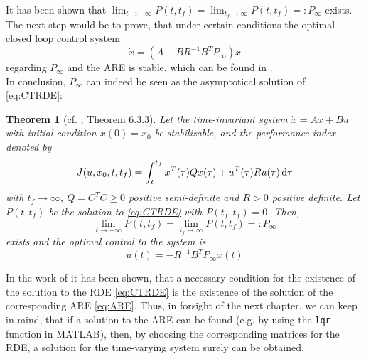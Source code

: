 \documentclass[paper=a4, pagesize, DIV=calc, BCOR=12.5mm, twoside=on, onecolumn=on, open = any, titlepage =on, parskip =half-, headsepline = on, footsepline = on, chapterprefix = on, appendixprefix = off, fontsize = 12pt, numbers = noenddot, abstract = on]{scrbook}
\numberwithin{equation}{chapter}
\theoremstyle{definition}
\theoremstyle{plain}
\theoremstyle{plain}
\newtheorem{satz}{Theorem}
\theoremstyle{remark}
\theoremstyle{plain}
\theoremstyle{plain}
\begin{document}
It has been shown that $\lim_{t \rightarrow - \infty} P(t, t_f) = \lim_{t_f \rightarrow \infty}P(t, t_f) =: P_\infty$ exists. The next step would be to prove, that under certain conditions the optimal closed loop control system \[ \dot{x} = (A-BR^{-1}B^TP_\infty)x \] regarding $P_\infty$ and the ARE is stable, which can be found in \cite{li:2006}.\\
In conclusion, $P_\infty$ can indeed be seen as the asymptotical solution of \eqref{eq:CTRDE}:
\begin{satz}[cf. \cite{li:2006}, Theorem 6.3.3]
Let the time-invariant system $\dot{x} = Ax +Bu$ with initial condition $x(0) = x_0$ be stabilizable, and the performance index denoted by
\begin{equation*}
J(u, x_0, t, t_f) = \int_t^{t_f} x^T(\tau)Qx(\tau) + u^T(\tau)Ru(\tau) \mathop{}\!\mathrm{d} \tau
\end{equation*}
with $t_f \rightarrow \infty$, $Q=C^TC \geq 0$ positive semi-definite and $R>0$ positive definite. Let $P(t,t_f)$ be the solution to \eqref{eq:CTRDE} with $P(t_f, t_f) = 0$. Then,
\[
\lim_{t \rightarrow - \infty} P(t, t_f) = \lim_{t_f \rightarrow \infty}P(t, t_f) =: P_\infty
\]
exists and the optimal control to the system is
\[
u(t) = -R^{-1}B^TP_\infty x(t)
\]
\end{satz}
In the work of \cite{kil:2010} it has been shown, that a necessary condition for the existence of the solution to the RDE \eqref{eq:CTRDE} is the existence of the solution of the corresponding ARE \eqref{eq:ARE}. Thus, in forsight of the next chapter, we can keep in mind, that if a solution to the ARE can be found (e.g. by using the \texttt{lqr} function in MATLAB), then, by choosing the corresponding matrices for the RDE, a solution for the time-varying system surely can be obtained.
\end{document}
